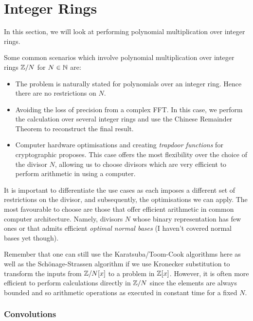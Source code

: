 \chapter{Integer Rings}\label{chp:integer-rings}

In this section, we will look at performing polynomial multiplication over integer rings.

Some common scenarios which involve polynomial multiplication over integer rings ${\mathbb Z}/N$ for $N \in {\mathbb N}$ are:
\begin{itemize}
    \item The problem is naturally stated for polynomials over an integer ring. Hence there are no restrictions on $N$.
    \item Avoiding the loss of precision from a complex FFT. In this case, we perform the calculation over several integer rings and use the Chinese Remainder Theorem to reconstruct the final result.
    \item Computer hardware optimisations and creating \emph{trapdoor functions} for cryptographic proposes. This case offers the most flexibility over the choice of the divisor $N$, allowing us to choose divisors which are very efficient to perform arithmetic in using a computer.
\end{itemize}

It is important to differentiate the use cases as each imposes a different set of restrictions on the divisor, and subsequently, the optimisations we can apply. The most favourable to choose are those that offer efficient arithmetic in common computer architecture. Namely, divisors $N$ whose binary representation has few ones or that admits efficient \emph{optimal normal bases} (I haven't covered normal bases yet though).

Remember that one can still use the Karatsuba/Toom-Cook algorithms here as well as the Sch\"{o}nage-Strassen algorithm if we use Kronecker substitution to transform the inputs from ${\mathbb Z}/N[x]$ to a problem in ${\mathbb Z}[x]$. However, it is often more efficient to perform calculations directly in ${\mathbb Z}/N$ since the elements are always bounded and so arithmetic operations as executed in constant time for a fixed $N$.


\subsection{Convolutions}

